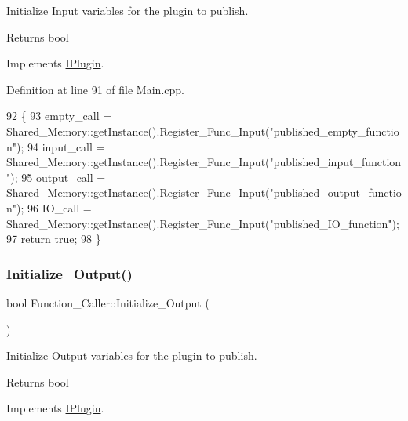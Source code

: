 Initialize Input variables for the plugin to publish. 

\begin{DoxyReturn}{Returns}
bool 
\end{DoxyReturn}


Implements \hyperlink{class_i_plugin_aa7c66743ad956d8ada57becee559af4d}{I\+Plugin}.



Definition at line 91 of file Main.\+cpp.


\begin{DoxyCode}
92 \{
93     empty\_call = Shared\_Memory::getInstance().Register\_Func\_Input(\textcolor{stringliteral}{"published\_empty\_function"});
94     input\_call = Shared\_Memory::getInstance().Register\_Func\_Input(\textcolor{stringliteral}{"published\_input\_function"});
95     output\_call = Shared\_Memory::getInstance().Register\_Func\_Input(\textcolor{stringliteral}{"published\_output\_function"});
96     IO\_call = Shared\_Memory::getInstance().Register\_Func\_Input(\textcolor{stringliteral}{"published\_IO\_function"});
97     \textcolor{keywordflow}{return} \textcolor{keyword}{true};
98 \}
\end{DoxyCode}
\mbox{\label{class_function___caller_a6499f7bae56266b6372351da555f316f}} 
\subsubsection{\texorpdfstring{Initialize\+\_\+\+Output()}{Initialize\_Output()}}
{\footnotesize\ttfamily bool Function\+\_\+\+Caller\+::\+Initialize\+\_\+\+Output (\begin{DoxyParamCaption}{ }\end{DoxyParamCaption})\hspace{0.3cm}{\ttfamily [virtual]}}



Initialize Output variables for the plugin to publish. 

\begin{DoxyReturn}{Returns}
bool 
\end{DoxyReturn}


Implements \hyperlink{class_i_plugin_a0b772513fc8c4ed01240e19c4bb84068}{I\+Plugin}.



